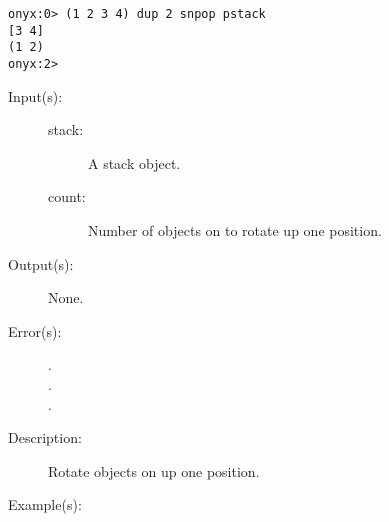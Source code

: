 \begin{description}
\begin{description}
\begin{verbatim}
onyx:0> (1 2 3 4) dup 2 snpop pstack
[3 4]
(1 2)
onyx:2>
		\end{verbatim}
	\end{description}
\label{systemdict:snup}
\item[{\onyxop{stack count}{snup}{--}}: ]
	\begin{description}\item[]
	\item[Input(s): ]
		\begin{description}\item[]
		\item[stack: ]
			A stack object.
		\item[count: ]
			Number of objects on  to rotate up one
			position.
		\end{description}
	\item[Output(s): ] None.
	\item[Error(s): ]
		\begin{description}\item[]
		\item[.]
		\item[.]
		\item[.]
		\end{description}
	\item[Description: ]
		Rotate  objects on  up one position.
	\item[Example(s): ]\begin{verbatim}


\end{verbatim}
\end{description}
\end{description}
